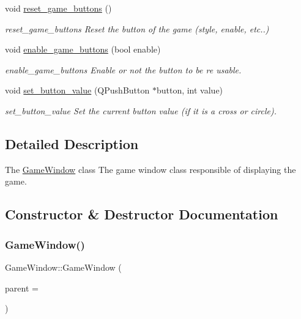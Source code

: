 \begin{DoxyCompactItemize}
\mbox{\label{class_game_window_a4b226699ff95a77a540f4d141f5cae4f}} 
void \hyperlink{class_game_window_a4b226699ff95a77a540f4d141f5cae4f}{reset\+\_\+game\+\_\+buttons} ()
\begin{DoxyCompactList}\small\item\em reset\+\_\+game\+\_\+buttons Reset the button of the game (style, enable, etc..) \end{DoxyCompactList}\item 
void \hyperlink{class_game_window_a55e1796bc70513802f85f3830140011b}{enable\+\_\+game\+\_\+buttons} (bool enable)
\begin{DoxyCompactList}\small\item\em enable\+\_\+game\+\_\+buttons Enable or not the button to be re usable. \end{DoxyCompactList}\item 
void \hyperlink{class_game_window_adb7764f6b74f57ba2197cb9f5a65c47b}{set\+\_\+button\+\_\+value} (Q\+Push\+Button $\ast$button, int value)
\begin{DoxyCompactList}\small\item\em set\+\_\+button\+\_\+value Set the current button value (if it is a cross or circle). \end{DoxyCompactList}\end{DoxyCompactItemize}


\subsection{Detailed Description}
The \hyperlink{class_game_window}{Game\+Window} class The game window class responsible of displaying the game. 

\subsection{Constructor \& Destructor Documentation}
\mbox{\label{class_game_window_a016b254d770fc4c2ce4a21a4c6f38fbc}} 
\subsubsection{\texorpdfstring{Game\+Window()}{GameWindow()}}
{\footnotesize\ttfamily Game\+Window\+::\+Game\+Window (\begin{DoxyParamCaption}\item[{Q\+Widget $\ast$}]{parent = {} }\end{DoxyParamCaption})\hspace{0.3cm}{\ttfamily [explicit]}}




